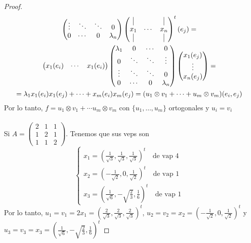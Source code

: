 \documentclass[12pt]{article}
\theoremstyle{break}
\newtheorem*{proof}{Demostración}
\begin{document}
\begin{proof}
\begin{gather*}
\begin{pmatrix}
		\vdots & \ddots & \ddots & 0 \\ 0 & \cdots & 0 & \lambda_n
		\end{pmatrix} \begin{pmatrix}
		\vline & & \vline \\ x_1 & \cdots & x_n \\ \vline & & \vline
		\end{pmatrix}^t (e_j) = \\
		\begin{pmatrix}
			x_1(e_i) & \cdots & x_1(e_i)
		\end{pmatrix} \begin{pmatrix}
		\lambda_1 & 0 & \cdots & 0 \\ 0 & \ddots & \ddots & \vdots \\
		\vdots & \ddots & \ddots & 0 \\ 0 & \cdots & 0 & \lambda_n
		\end{pmatrix} \begin{pmatrix}
			x_1(e_j) \\ \vdots \\ x_n(e_j)
		\end{pmatrix} = \\
		= \lambda_1 x_1(e_i)x_1(e_j) + \cdots + x_m(e_i)x_m(e_j) =
		(u_1 \otimes v_1 + \cdots + u_m \otimes v_m)(e_i,e_j)
	\end{gather*}
	Por lo tanto, $f = u_1 \otimes v_1 + \cdots u_m \otimes v_m$ con $\{u_1,\dots,u_m\}$
	ortogonales y $u_i = v_i$
	\\\\
	Si $A = \begin{pmatrix}
	2 & 1 & 1 \\ 1 & 2 & 1 \\ 1 & 1 & 2
	\end{pmatrix}$. Tenemos que sus veps son
	\[\begin{cases}
		x_1 = \left(\frac{1}{\sqrt{3}},\frac{1}{\sqrt{3}},\frac{1}{\sqrt{3}}\right)^t
		\quad \text{de vap } 4 \\
		x_2=\left(-\frac{1}{\sqrt{2}},0,\frac{1}{\sqrt{2}}\right)^t \quad \text{de vap } 1 \\
		x_3 = \left(\frac{1}{\sqrt{6}},-\sqrt{\frac{2}{3}},\frac{1}{6} \right)^t \quad
		\text{de vap } 1
	\end{cases}\]
	Por lo tanto, $u_1 = v_1 = 2x_1 = \left(\frac{2}{\sqrt{3}},\frac{2}{\sqrt{3}},\frac{2}{\sqrt{3}}\right)^t$,
	$u_2 = v_2 = x_2 = \left(-\frac{1}{\sqrt{2}},0,\frac{1}{\sqrt{2}}\right)^t$ y 
	$u_3 = v_3 = x_3 = \left(\frac{1}{\sqrt{6}},-\sqrt{\frac{2}{3}},\frac{1}{6} \right)^t$
\end{proof}
\end{document}
